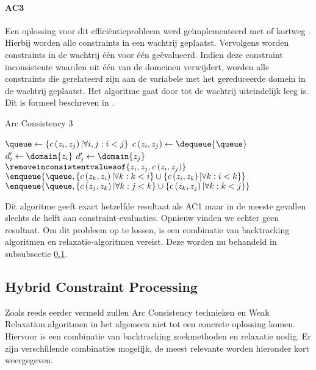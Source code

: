 \paragraph{AC3} Een oplossing voor dit effici\"entieprobleem werd ge\"implementeerd met  of kortweg . Hierbij worden alle constraints in een wachtrij geplaatst. Vervolgens worden constraints in de wachtrij \'e\'en voor \'e\'en ge\"evalueerd. Indien deze constraint inconsistente waarden uit \'e\'en van de domeinen verwijdert, worden alle constraints die gerelateerd zijn aan de variabele met het gereduceerde domein in de wachtrij geplaatst. Het algoritme gaat door tot de wachtrij uiteindelijk leeg is. Dit is formeel beschreven in .
\begin{algorithm}[htb]                      %
\caption{Arc Consistency 3}          %
\label{alg:arcConsistency3}                           %
\begin{algorithmic}[1]                    %
\STATE $\queue\leftarrow\left\{c\left(z_i,z_j\right)|\forall i,j:i<j\right\}$
\WHILE{$\notempty{\queue}$}
\STATE$c\left(z_i,z_j\right)\leftarrow\dequeue{\queue}$
\STATE$d_{i}'\leftarrow\domain{z_i}$
\STATE$d_{j}'\leftarrow\domain{z_j}$
\STATE$\removeinconsistentvaluesof{z_i,z_j,c\left(z_i,z_j\right)}$
\STATE$\enqueue{\queue,\left\{c\left(z_k,z_i\right)|\forall k:k<i\right\}\cup\left\{c\left(z_i,z_k\right)|\forall k:i<k\right\}}$
\ENDIF
{}
\STATE$\enqueue{\queue,\left\{c\left(z_j,z_k\right)|\forall k:j<k\right\}\cup\left\{c\left(z_k,z_j\right)|\forall k:k<j\right\}}$
\ENDIF
\ENDWHILE
\end{algorithmic}
\end{algorithm}
Dit algoritme geeft exact hetzelfde resultaat als AC1 maar in de meeste gevallen slechts de helft aan constraint-evaluaties. Opnieuw vinden we echter geen resultaat. Om dit probleem op te lossen, is een combinatie van backtracking algoritmen en relaxatie-algoritmen vereist. Deze worden nu behandeld in subsubsectie \ref{sss:hybridConstraintProcessing}.
\subsection{Hybrid Constraint Processing}
\label{sss:hybridConstraintProcessing}
Zoals reeds eerder vermeld zullen Arc Consistency technieken en Weak Relaxation algoritmen in het algemeen niet tot een concrete oplossing komen. Hiervoor is een combinatie van backtracking zoekmethoden en relaxatie nodig. Er zijn verschillende combinaties mogelijk, de meest relevante worden hieronder kort weergegeven.
